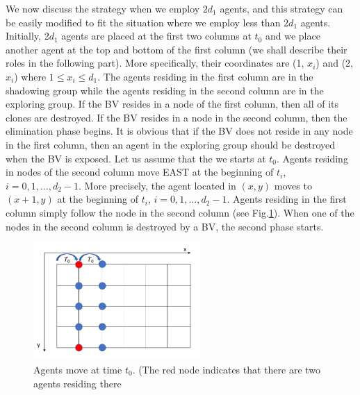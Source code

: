 We now discuss the strategy when we employ $2d_1$ agents, and this strategy can be easily modified to fit the situation where we employ less than $2d_1$ agents.\\
Initially, 2$d_1$ agents are placed at the first two columns at $t_0$ and we place another  agent at the top and bottom of the first column (we shall describe their roles in the following part). More specifically, their coordinates   are (1, $x_i$) and (2,$x_i$) where $1\leq x_i\leq d_1$. The agents residing in the first column are in the shadowing group while the agents residing in the second column are in the exploring group. If the BV resides in a node of the first column, then all of its clones are destroyed. If the BV resides in a node in the second column, then the elimination phase begins. It is obvious that if the BV does not reside in any node in the first column, then an agent in the exploring group should be destroyed when the BV is exposed.  Let us assume that the we starts at $t_0$. Agents residing in nodes of the second column move  EAST at the beginning of $t_i$, $i=0,1, \ldots ,d_2-1$. More precisely, the agent located in $(x, y)$ moves to $(x+1, y)$ at the beginning of $t_i$, $i=0,1, \dots , d_2-1$. Agents residing in the first column simply follow the node in the second column (see  Fig.\ref{fig:moving}). When one of the nodes in the second  column is destroyed by a BV, the second phase starts.
\begin{figure}[H]
  \centering  
  \includegraphics[width=2.5in]{figures/moving.png}
  \caption{Agents move at time $t_0$. (The red node indicates that there are two agents residing there}\label{fig:moving}
\end{figure}
\\
